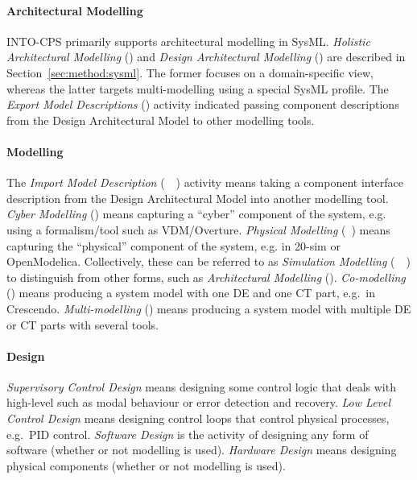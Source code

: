 \paragraph{Architectural Modelling}

INTO-CPS primarily supports architectural modelling in SysML. \emph{Holistic Architectural Modelling} (\Modelio) and \emph{Design Architectural Modelling} (\Modelio) are described in Section~\ref{sec:method:sysml}. The former focuses on a domain-specific view, whereas the latter targets multi-modelling using a special SysML profile. The \emph{Export Model Descriptions} (\Modelio) activity indicated passing component descriptions from the Design Architectural Model to other modelling tools.

\paragraph{Modelling}

The \emph{Import Model Description} (\Overture~\TwentySim~\OpenModelica) activity means taking a component interface description from the Design Architectural Model into another modelling tool. \emph{Cyber Modelling} (\Overture) means capturing a ``cyber'' component of the system, e.g. using a formalism/tool such as VDM/Overture. \emph{Physical Modelling} (\TwentySim~\OpenModelica) means capturing the ``physical'' component of the system, e.g. in 20-sim  or OpenModelica. Collectively, these can be referred to as \emph{Simulation Modelling} (\Overture~\TwentySim~\OpenModelica) to distinguish from other forms, such as \emph{Architectural Modelling} (\Modelio). \emph{Co-modelling} (\Crescendo) means producing a system model with one DE and one CT part, e.g.\ in Crescendo. \emph{Multi-modelling} (\INTOCPS) means producing a system model with multiple DE or CT parts with several tools.

\paragraph{Design}

\emph{Supervisory Control Design} means designing some control logic that deals with high-level such as modal behaviour or error detection and recovery. \emph{Low Level Control Design} means designing control loops that control physical processes, e.g.\ PID control. \emph{Software Design} is the activity of designing any form of software (whether or not modelling is used). \emph{Hardware Design} means designing physical components (whether or not modelling is used).

